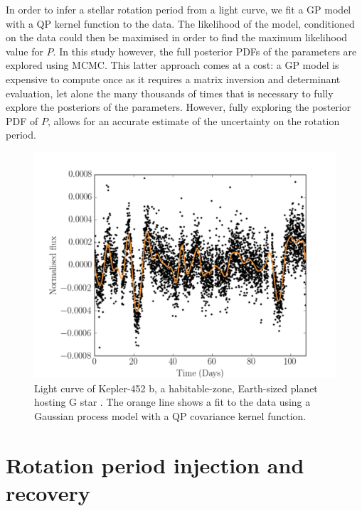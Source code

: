 In order to infer a stellar rotation period from a light curve, we fit a GP
model with a QP kernel function to the data.
The likelihood of the model, conditioned on the data could then be maximised
in order to find the maximum likelihood value for $P$.
In this study however, the full posterior PDFs of the parameters are explored
using MCMC.
This latter approach comes at a cost: a GP model is expensive to compute once
as it requires a matrix inversion and determinant evaluation, let alone the
many thousands of times that is necessary to fully explore the posteriors of
the parameters.
However, fully exploring the posterior PDF of $P$, allows for an accurate
estimate of the uncertainty on the rotation period.

\begin{figure}
\begin{center}
\includegraphics[width=6in, clip=true]{figures/Kepler452b.pdf}
\caption[A light curve with a GP model.]
{Light curve of Kepler-452 b, a habitable-zone, Earth-sized planet
hosting G star \citep{Jenkins2015}. The orange line shows a fit to the data using
a Gaussian process model with a QP covariance kernel function.}
\label{fig:GP_example}
\end{center}
\end{figure}

\section{Rotation period injection and recovery}

